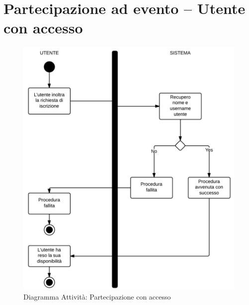 \section{Partecipazione ad evento – Utente con accesso}
\begin{figure}[H]
\centering
\includegraphics[scale=0.25]{img/activity/PartCa.png}
\caption{Diagramma Attività: Partecipazione con accesso}
\label{fig:attpartCa}
\end{figure}

